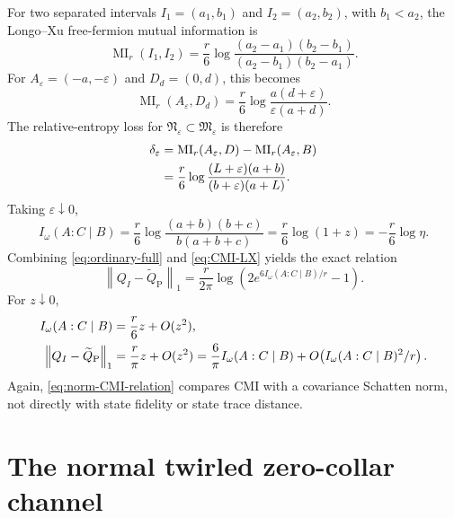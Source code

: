 \documentclass[11pt]{article}
\theoremstyle{accent}
\theoremstyle{definition}
\newcommand{\cM}{\mathfrak{M}}
\newcommand{\cN}{\mathfrak{N}}
\newcommand{\eps}{\varepsilon}
\newcommand{\MI}{\operatorname{MI}}
\newcommand{\CMI}{I}
\newcommand{\norm}[1]{\left\lVert #1\right\rVert}
\begin{document}
For two separated intervals \(I_1=(a_1,b_1)\) and \(I_2=(a_2,b_2)\), with \(b_1<a_2\), the Longo--Xu free-fermion mutual information is
\begin{equation}\label{eq:LX-MI}
 \MI_r(I_1,I_2)
 =\frac r6\log
 \frac{(a_2-a_1)(b_2-b_1)}{(a_2-b_1)(b_2-a_1)}.
\end{equation}
For \(A_\eps=(-a,-\eps)\) and \(D_d=(0,d)\), this becomes
\begin{equation}\label{eq:LX-collar-MI}
 \MI_r(A_\eps,D_d)
 =\frac r6\log\frac{a(d+\eps)}{\eps(a+d)}.
\end{equation}
The relative-entropy loss for \(\cN_\eps\subset\cM_\eps\) is therefore
\begin{align}
 \delta_\eps
 &=\MI_r(A_\eps,D)-\MI_r(A_\eps,B)\notag\\
 &=\frac r6\log
 \frac{(L+\eps)(a+b)}{(b+\eps)(a+L)}.
 \label{eq:delta-eps}
\end{align}
Taking \(\eps\downarrow0\),
\begin{equation}\label{eq:CMI-LX}
 \boxed{
 \CMI_\omega(A:C\mid B)
 =\frac r6\log\frac{(a+b)(b+c)}{b(a+b+c)}
 =\frac r6\log(1+z)
 =-\frac r6\log\eta.
 }
\end{equation}
Combining \eqref{eq:ordinary-full} and \eqref{eq:CMI-LX} yields the exact relation
\begin{equation}\label{eq:norm-CMI-relation}
 \boxed{
 \norm{Q_I-\widetilde Q_{\mathrm P}}_1
 =\frac r{2\pi}
 \log\!\left(2e^{6\CMI_\omega(A:C\mid B)/r}-1\right).
 }
\end{equation}
For \(z\downarrow0\),
\begin{align}
 \CMI_\omega(A:C\mid B)&=\frac r6z+O(z^2),\notag\\
 \norm{Q_I-\widetilde Q_{\mathrm P}}_1&=\frac r\pi z+O(z^2)
 =\frac6\pi\CMI_\omega(A:C\mid B)+O\!\left(\CMI_\omega(A:C\mid B)^2/r\right).
 \label{eq:small-z}
\end{align}
Again, \eqref{eq:norm-CMI-relation} compares CMI with a covariance Schatten norm, not directly with state fidelity or state trace distance.

\section{The normal twirled zero-collar channel}
\end{document}
